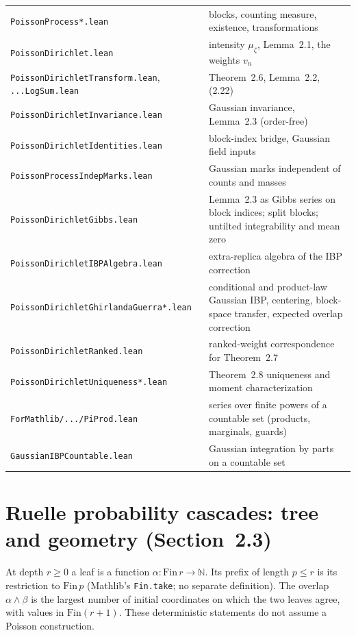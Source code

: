 \begin{center}
\begin{tabular}{ll}
\texttt{PoissonProcess*.lean} & blocks, counting measure, existence, transformations \\
\texttt{PoissonDirichlet.lean} & intensity $\mu_\zeta$, Lemma~2.1, the weights $v_n$ \\
\texttt{PoissonDirichletTransform.lean}, \texttt{...LogSum.lean} & Theorem~2.6, Lemma~2.2, (2.22) \\
\texttt{PoissonDirichletInvariance.lean} & Gaussian invariance, Lemma~2.3 (order-free) \\
\texttt{PoissonDirichletIdentities.lean} & block-index bridge, Gaussian field inputs \\
\texttt{PoissonProcessIndepMarks.lean} & Gaussian marks independent of counts and masses \\
\texttt{PoissonDirichletGibbs.lean} & Lemma~2.3 as Gibbs series on block indices; split blocks; untilted integrability and mean zero \\
\texttt{PoissonDirichletIBPAlgebra.lean} & extra-replica algebra of the IBP correction \\
\texttt{PoissonDirichletGhirlandaGuerra*.lean} & conditional and product-law Gaussian IBP, centering, block-space transfer, expected overlap correction \\
\texttt{PoissonDirichletRanked.lean} & ranked-weight correspondence for Theorem~2.7 \\
\texttt{PoissonDirichletUniqueness*.lean} & Theorem~2.8 uniqueness and moment characterization \\
\texttt{ForMathlib/.../PiProd.lean} & series over finite powers of a countable set (products, marginals, guards) \\
\texttt{GaussianIBPCountable.lean} & Gaussian integration by parts on a countable set \\
\end{tabular}
\end{center}

\section{Ruelle probability cascades: tree and geometry (Section~2.3)}\label{sec:sg:cascade}

At depth $r\ge0$ a leaf is a function $\alpha:\mathrm{Fin}\,r\to\mathbb N$.
Its prefix of length $p\le r$ is its restriction to $\mathrm{Fin}\,p$
(Mathlib's \texttt{Fin.take}; no separate definition).
The overlap $\alpha\wedge\beta$ is the largest number of initial coordinates
on which the two leaves agree, with values in $\mathrm{Fin}(r+1)$.
These deterministic statements do not assume a Poisson construction.

